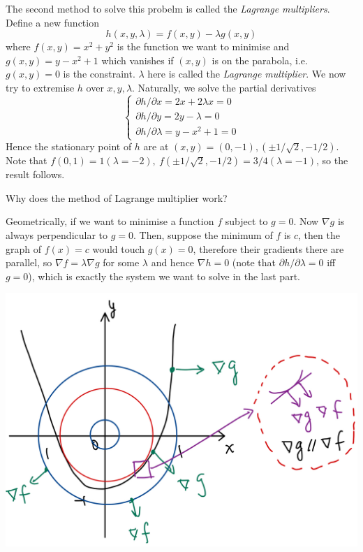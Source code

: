 \documentclass{article}
\begin{document}
\begin{example}
    The second method to solve this probelm is called the \textit{Lagrange multipliers}.
    Define a new function
    $$h(x,y,\lambda)=f(x,y)-\lambda g(x,y)$$
    where $f(x,y)=x^2+y^2$ is the function we want to minimise and $g(x,y)=y-x^2+1$ which vanishes if $(x,y)$ is on the parabola, i.e. $ g(x,y)=0 $ is the constraint.
    $\lambda$ here is called the \textit{Lagrange multiplier}.
    We now try to extremise $h$ over $x,y,\lambda$.
    Naturally, we solve the partial derivatives
    $$\begin{cases}
        \partial h/\partial x=2x+2\lambda x=0\\
        \partial h/\partial y=2y-\lambda=0\\
        \partial h/\partial\lambda=y-x^2+1=0
    \end{cases}$$
    Hence the stationary point of $h$ are at $(x,y)=(0,-1),(\pm 1/\sqrt{2},-1/2)$.
    Note that $ f(0,1)=1(\lambda=-2),\ f(\pm 1/\sqrt{2},-1/2)=3/4(\lambda=-1) $, so the result follows.
\end{example}

Why does the method of Lagrange multiplier work?

Geometrically, if we want to minimise a function $f$ subject to $g=0$.
Now $\nabla g$ is always perpendicular to $g=0$.
Then, suppose the minimum of $f$ is $c$, then the graph of $f(x)=c$ would touch $g(x)=0$, therefore their gradients there are parallel, so $\nabla f=\lambda\nabla g$ for some $\lambda$ and hence $\nabla h=0$ (note that $\partial h/\partial\lambda=0$ iff $g=0$), which is exactly the system we want to solve in the last part.

\begin{center}
    \includegraphics[scale=0.15]{best_fit_circ2.jpeg}
\end{center}
\end{document}
